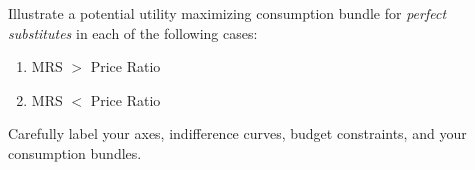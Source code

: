 \begin{question}[type=exam]{8}
  Illustrate a potential utility maximizing consumption bundle for \textit{perfect substitutes}
  in each of the following cases:
  \begin{enumerate}
    \item MRS $>$ Price Ratio
    \item MRS $<$ Price Ratio
  \end{enumerate}
  Carefully label your axes, indifference curves, budget constraints, and your consumption bundles.
\end{question}
